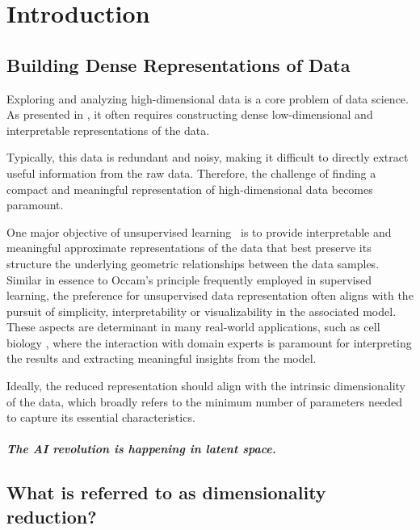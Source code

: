 \chapter{Introduction}\label{chap:intro}

\minitoc

\section{Building Dense Representations of Data}

Exploring and analyzing high-dimensional data is a core problem of data science. As presented in , it often requires constructing dense low-dimensional and interpretable representations of the data. 


Typically, this data is redundant and noisy, making it difficult to directly extract useful information from the raw data. Therefore, the challenge of finding a compact and meaningful representation of high-dimensional data becomes paramount.


One major objective of unsupervised learning~\citep{Hastie2009} is to provide interpretable and meaningful approximate representations of the data that best preserve its structure \ie the underlying geometric relationships between the data samples.
Similar in essence to Occam's principle frequently employed in supervised learning, the preference for unsupervised data representation often aligns with the pursuit of simplicity, interpretability or visualizability in the associated model.
These aspects are determinant in many real-world applications, such as cell biology
\citep{cantini2021benchmarking, ventre2023one}, where the interaction with domain experts is paramount for interpreting the results and extracting meaningful insights from the model. 

Ideally, the reduced representation should align with the intrinsic dimensionality of the data, which broadly refers to the minimum number of parameters needed to capture its essential characteristics.






\paragraph{The AI revolution is happening in latent space.}


\section{What is referred to as dimensionality reduction?}



